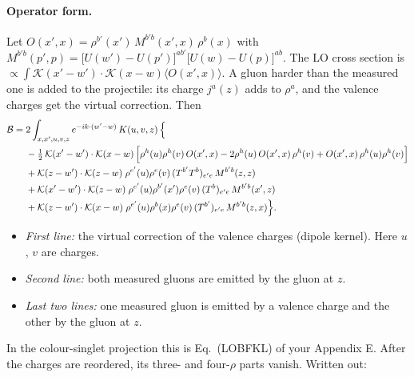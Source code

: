 \documentclass[10pt]{article}
\numberwithin{equation}{section}
\newcommand{\KK}{\mathcal K}
\newcommand{\B}{\mathcal B}
\begin{document}
\paragraph{Operator form.} Let $O(x',x)=\rho^{b'}(x')\,M^{b'b}(x',x)\,\rho^b(x)$ with $M^{b'b}(p',p)=\big[U(w')-U(p')\big]^{ab'}\big[U(w)-U(p)\big]^{ab}$. The LO cross section is $\propto\int\KK(x'-w')\cdot\KK(x-w)\langle O(x',x)\rangle$. A gluon harder than the measured one is added to the projectile: its charge $j^a(z)$ adds to $\rho^a$, and the valence charges get the virtual correction. Then
\begin{align}
\B={}&2\int_{x,x',u,v,z}e^{-ik\cdot(w'-w)}\,K(u,v,z)\,\Big\{\notag\\
&-\tfrac12\,\KK(x'-w')\cdot\KK(x-w)\,\Big[\rho^h(u)\rho^h(v)\,O(x',x)-2\rho^h(u)\,O(x',x)\,\rho^h(v)+O(x',x)\,\rho^h(u)\rho^h(v)\Big]\notag\\
&+\KK(z-w')\cdot\KK(z-w)\;\rho^{e'}(u)\rho^e(v)\,(T^{b'}T^b)_{e'e}\,M^{b'b}(z,z)\notag\\
&+\KK(x'-w')\cdot\KK(z-w)\;\rho^{e'}(u)\rho^{b'}(x')\rho^e(v)\,(T^b)_{e'e}\,M^{b'b}(x',z)\notag\\
&+\KK(z-w')\cdot\KK(x-w)\;\rho^{e'}(u)\rho^{b}(x)\rho^e(v)\,(T^{b'})_{e'e}\,M^{b'b}(z,x)\Big\}.
\label{eq:Bop}
\end{align}
\begin{itemize}
\item \emph{First line:} the virtual correction of the valence charges (dipole kernel). Here $u$, $v$ are charges.
\item \emph{Second line:} both measured gluons are emitted by the gluon at $z$.
\item \emph{Last two lines:} one measured gluon is emitted by a valence charge and the other by the gluon at $z$.
\end{itemize}
In the colour-singlet projection this is Eq.~(LOBFKL) of your Appendix E. After the charges are reordered, its three- and four-$\rho$ parts vanish. Written out:
\end{document}
